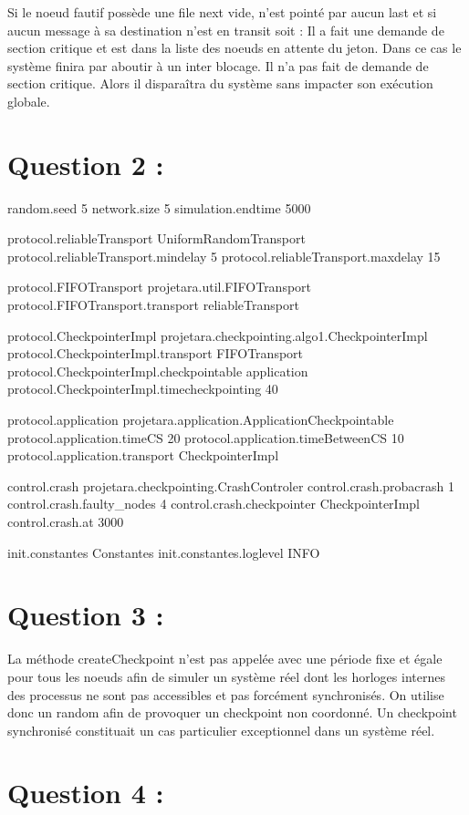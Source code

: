 \documentclass[11pt,a4paper]{report}
\begin{document}
Si le noeud fautif possède une file next vide, n’est pointé par aucun last et si aucun message à sa destination n’est en transit soit :
 Il a fait une demande de section critique et est dans la liste des noeuds en attente du jeton. Dans ce cas le système finira par aboutir à un inter blocage.
 Il n'a pas fait de demande de section critique. Alors il disparaîtra du système sans impacter son exécution globale.


\section{Question 2 :}

random.seed 5
network.size 5
simulation.endtime 5000

protocol.reliableTransport UniformRandomTransport
protocol.reliableTransport.mindelay 5
protocol.reliableTransport.maxdelay 15

protocol.FIFOTransport projetara.util.FIFOTransport
protocol.FIFOTransport.transport reliableTransport

protocol.CheckpointerImpl projetara.checkpointing.algo1.CheckpointerImpl
protocol.CheckpointerImpl.transport FIFOTransport
protocol.CheckpointerImpl.checkpointable application
protocol.CheckpointerImpl.timecheckpointing 40

protocol.application projetara.application.ApplicationCheckpointable
protocol.application.timeCS 20
protocol.application.timeBetweenCS 10
protocol.application.transport CheckpointerImpl

control.crash projetara.checkpointing.CrashControler
control.crash.probacrash 1
control.crash.faulty_nodes 4
control.crash.checkpointer CheckpointerImpl
control.crash.at 3000

init.constantes Constantes
init.constantes.loglevel INFO


\section{Question 3 :}

La méthode createCheckpoint n'est pas appelée avec une période fixe et égale pour tous les noeuds afin de simuler un système réel dont les horloges internes des processus ne sont pas accessibles et pas forcément synchronisés. On utilise donc un random afin de provoquer un checkpoint non coordonné.
Un checkpoint synchronisé constituait un cas particulier exceptionnel dans un système réel.


\section{Question 4 :}
\end{document}
